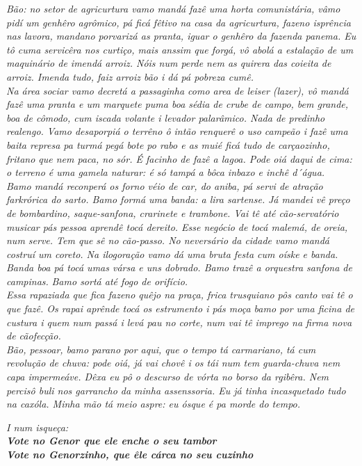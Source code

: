 \documentclass[12pt,brazil,]{book}
\begin{document}
\emph{Bão: no setor de agricurtura vamo mandá fazê uma horta
comunistária, vâmo pidí um genhêro agrômico, pá ficá fêtivo na casa da
agricurtura, fazeno isprência nas lavora, mandano porvarizá as pranta,
iguar o genhêro da fazenda panema. Eu tô cuma servicêra nos curtiço,
mais anssim que forgá, vô abolá a estalação de um maquinário de imendá
arroiz. Nóis num perde nem as quirera das coieita de arroiz. Imenda
tudo, faiz arroiz bão i dá pá pobreza cumê.}\\
\emph{Na área sociar vamo decretá a passaginha como area de leiser
(lazer), vô mandá fazê uma pranta e um marquete puma boa sédia de crube
de campo, bem grande, boa de cômodo, cum iscada volante i levador
palarâmico. Nada de predinho realengo. Vamo desaporpiá o terrêno ô intão
renquerê o uso campeão i fazê uma baita represa pa turmá pegá bote po
rabo e as muié ficá tudo de carçaozinho, fritano que nem paca, no sór. É
facinho de fazê a lagoa. Pode oiá daqui de cima: o terreno é uma gamela
naturar: é só tampá a bôca inbaxo e inchê d´água.}\\
\emph{Bamo mandá reconperá os forno véio de car, do aniba, pá servi de
atração farkrórica do sarto. Bamo formá uma banda: a lira sartense.}
\emph{Já mandei vê preço de bombardino, saque-sanfona, crarinete e
trambone. Vai tê até cão-servatório musicar pás pessoa aprendê tocá
dereito. Esse negócio de tocá malemá, de oreia, num serve. Tem que sê no
cão-passo. No neversário da cidade vamo mandá costruí um coreto. Na
ilogoração vamo dá uma bruta festa cum oíske e banda. Banda boa pá tocá
umas vársa e uns dobrado. Bamo trazê a orquestra sanfona de campinas.}
\emph{Bamo sortá até fogo de orifício.}\\
\emph{Essa rapaziada que fica fazeno quêjo na praça, frica trusquiano
pôs canto vai tê o que fazê. Os rapai aprênde tocá os estrumento i pás
moça bamo por uma ficina de custura i quem num passá i levá pau no
corte, num vai tê imprego na firma nova de cãofecção.}\\
\emph{Bão, pessoar, bamo parano por aqui, que o tempo tá carmariano, tá
cum revolução de chuva: pode oiá, já vai chovê i os tái num tem
guarda-chuva nem capa impermeáve. Dêxa eu pô o descurso de vórta no
borso da rgibêra. Nem percisô buli nos garrancho da minha assenssoria.
Eu já tinha incasquetado tudo na caxóla. Minha mão tá meio aspre: eu
ósque é pa morde do tempo.}

\emph{I num isqueça:}\\
\emph{\textbf{Vote no Genor que ele enche o seu tambor}}\\
\emph{\textbf{Vote no Genorzinho, que êle cárca no seu cuzinho}}
\end{document}
